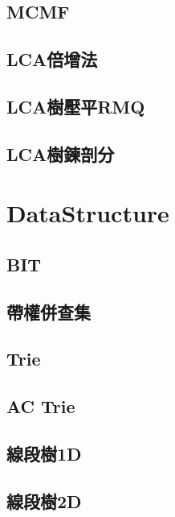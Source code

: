     \subsection{MCMF}
         \columnbreak
    \subsection{LCA倍增法}
         \columnbreak
    \subsection{LCA樹壓平RMQ}
        
    \subsection{LCA樹鍊剖分}
        
\clearpage

\section{DataStructure}
    \subsection{BIT}
        
    \subsection{帶權併查集}
         \columnbreak
    \subsection{Trie}
         \columnbreak
    \subsection{AC Trie}
         \columnbreak
    \subsection{線段樹1D}
         \columnbreak
    \subsection{線段樹2D}
         \columnbreak
